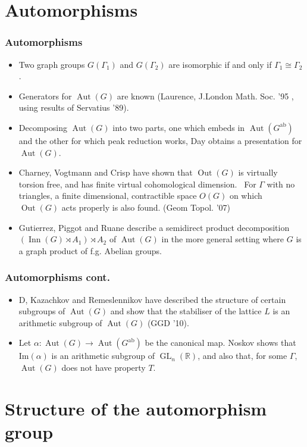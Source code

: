 \documentclass{beamer}
\def\RR{{\mathbb R}}
\def\G{\Gamma }
\def\a{\alpha }
\newcommand{\Aut}{\operatorname{Aut}}
\newcommand{\Out}{\operatorname{Out}}
\newcommand{\maps}{\rightarrow}
\newcommand{\Inn}{\operatorname{Inn}}
\newcommand{\GL}{\operatorname{GL}}
\begin{document}
\section{Automorphisms}
\begin{frame}
  \frametitle{Automorphisms}
\begin{itemize}
\item Two graph groups $G(\G_1)$ and $G(\G_2)$ are isomorphic if and only if $\G_1\cong \G_2$.
\pause
\item Generators for $\Aut(G)$ are known (Laurence, J.London Math. Soc. '95 , using results of 
Servatius '89).\pause
\item Decomposing $\Aut(G)$ into two parts, one which embeds in $\Aut(G^{\textrm{ab}})$ and
the other for which peak reduction works, Day obtains a presentation for $\Aut(G)$.\pause 
\item 
Charney, Vogtmann and Crisp have shown that $\Out(G)$ is virtually torsion
free, and has finite virtual cohomological dimension.\pause ~
For $\G$ with no triangles,  a finite dimensional, contractible space $O(G)$ 
on which $\Out(G)$ acts properly is also found.   (Geom Topol. '07)\pause
\item Gutierrez, Piggot and Ruane describe a semidirect product decomposition
$(\Inn(G)\rtimes A_1)\rtimes A_2$ of $\Aut(G)$ in the more general setting 
where $G$ is a graph product of f.g. Abelian groups.
\end{itemize}
\end{frame}
\begin{frame}
  \frametitle{Automorphisms cont. }
\begin{itemize}
\item D, Kazachkov and Remeslennikov have described the structure of certain subgroups of 
$\Aut(G)$ and show that the stabiliser of the lattice $L$ is an arithmetic subgroup of
$\Aut(G)$ (GGD '10).\pause
\item Let $\a:\Aut(G)\maps \Aut(G^{\textrm{ab}})$ be the canonical map. Noskov shows 
that Im$(\a)$ is an arithmetic subgroup of $\GL_n(\RR)$,  and also that, for some
$\G$, $\Aut(G)$ does not have property $T$.  
\end{itemize}
\end{frame}
\section{Structure of the automorphism group}
\end{document}
